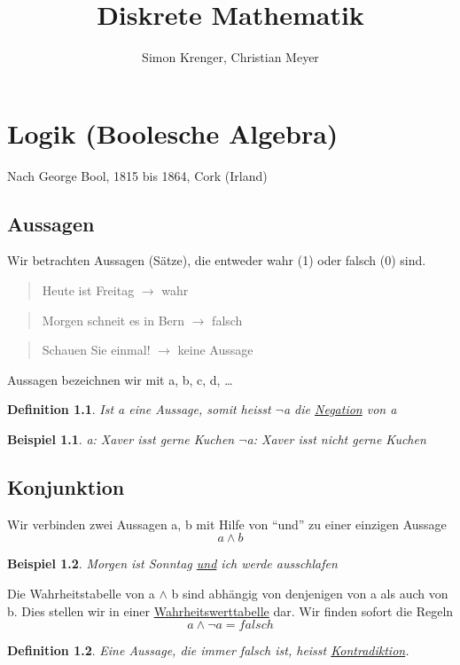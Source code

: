 \documentclass{report}
\title{Diskrete Mathematik}
\author{Simon Krenger, Christian Meyer}
\newtheorem{mydef}{Definition}
\newtheorem{myexample}{Beispiel}
\begin{document}
\maketitle
\chapter{Logik (Boolesche Algebra)}
Nach George Bool, 1815 bis 1864, Cork (Irland)
\section{Aussagen}
Wir betrachten Aussagen (Sätze), die entweder wahr (1) oder falsch (0) sind.

\begin{quote}Heute ist Freitag \(\to\) wahr\end{quote}
\begin{quote}Morgen schneit es in Bern \(\to\) falsch\end{quote}
\begin{quote}Schauen Sie einmal! \(\to\) keine Aussage\end{quote}
Aussagen bezeichnen wir mit a, b, c, d, …
\begin{mydef}
Ist a eine Aussage, somit heisst  \(\lnot\)a die \underline{Negation} von a
\end{mydef}
\begin{myexample}a: Xaver isst gerne Kuchen
\(\lnot\)a: Xaver isst nicht gerne Kuchen\end{myexample}

\section{Konjunktion}
Wir verbinden zwei Aussagen a, b mit Hilfe von “und” zu einer einzigen Aussage
\begin{equation}a \land b\end{equation}
\begin{myexample}Morgen ist Sonntag \underline{und} ich werde ausschlafen\end{myexample}

Die Wahrheitstabelle von a \(\land\) b sind abhängig von denjenigen von a als auch von b. Dies stellen wir in einer \underline{Wahrheitswerttabelle} dar. Wir finden sofort die Regeln
\begin{equation}a \land \lnot a = falsch\end{equation}


\begin{mydef}Eine Aussage, die immer falsch ist, heisst \underline{Kontradiktion}.\end{mydef}
\end{document}

